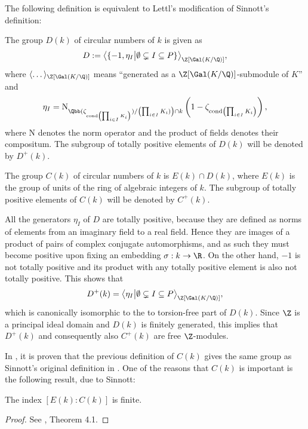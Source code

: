 The following definition is equivalent to Lettl's modification of Sinnott's definition:
\begin{definition}
The group $D(k)$ of circular numbers of $k$ is given as
$$D:=\big\langle \{-1, \eta_I \big\vert \emptyset \subsetneq I \subseteq P \}\big\rangle_{\Z[\Gal(K/\Q)]},$$
where $\langle \dots \rangle_{\Z[\Gal(K/\Q)]}$ means \enquote{generated as a $\Z[\Gal(K/\Q)]$-submodule of $K$} and $$\eta_I=\text{N}_{\Qbb(\zeta_{\text{cond} \left(\prod_{i\in I}K_i\right)})/\left(\prod_{i\in I}K_i)\right)\cap k}\left(1-\zeta_{\text{cond} \left(\prod_{i\in I}K_i\right)}\right),$$ where $\text{N}$ denotes the norm operator and the product of fields denotes their compositum. The subgroup of totally positive elements of $D(k)$ will be denoted by $D^+(k)$.
\end{definition}

\begin{definition}
The group $C(k)$ of circular numbers of $k$ is $E(k)\cap D(k)$, where $E(k)$ is the group of units of the ring of algebraic integers of $k$. The subgroup of totally positive elements of $C(k)$ will be denoted by $C^+(k)$.
\end{definition}

\begin{rem}
All the generators $\eta_I$ of $D$ are totally positive, because they are defined as norms of elements from an imaginary field to a real field. Hence they are images of a product of pairs of complex conjugate automorphisms, and as such they must become positive upon fixing an embedding $\sigma:k\to \R$. On the other hand, $-1$ is not totally positive and its product with any totally positive element is also not totally positive. This shows that $$D^+(k)=\big\langle  \eta_I \big\vert \emptyset \subsetneq I \subseteq P\big\rangle_{\Z[\Gal(K/\Q)]},$$
which is canonically isomorphic to the to torsion-free part of $D(k)$. Since $\Z$ is a principal ideal domain and $D(k)$ is finitely generated, this implies that $D^+(k)$ and consequently also $C^+(k)$ are free $\Z$-modules.
\end{rem}

In \citep{Lettl1990}, it is proven that the previous definition of $C(k)$ gives the same group as Sinnott's original definition in \citep{SinnottAb}. One of the reasons that $C(k)$ is important is the following result, due to Sinnott:
\begin{theorem}\label{finind}
The index $[E(k):C(k)]$ is finite.
\end{theorem}
\begin{proof}
See \citep{SinnottAb}, Theorem 4.1.
\end{proof}

